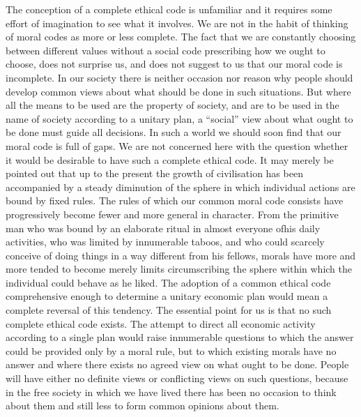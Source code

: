 \documentclass[11pt,openany]{book}
\begin{document}
The conception of a complete ethical code is unfamiliar and it requires some effort of imagination to see what it involves. We are not in the habit of thinking of moral codes as more or less complete. The fact that we are constantly choosing between different values without a social code prescribing how we ought to choose, does not surprise us, and does not suggest to us that our moral code is incomplete. In our society there is neither occasion nor reason why people should develop common views about what should be done in such situations. But where all the means to be used are the property of society, and are to be used in the name of society according to a unitary plan, a ``social'' view about what ought to be done must guide all decisions. In such a world we should soon find that our moral code is full of gaps. We are not concerned here with the question whether it would be desirable to have such a complete ethical code. It may merely be pointed out that up to the present the growth of civilisation has been accompanied by a steady diminution of the sphere in which individual actions are bound by fixed rules. The rules of which our common moral code consists have progressively become fewer and more general in character. From the primitive man who was bound by an elaborate ritual in almost everyone ofhis daily activities, who was limited by innumerable taboos, and who could scarcely conceive of doing things in a way different from his fellows, morals have more and more tended to become merely limits circumscribing the sphere within which the individual could behave as he liked. The adoption of a common ethical code comprehensive enough to determine a unitary economic plan would mean a complete reversal of this tendency. The essential point for us is that no such complete ethical code exists. The attempt to direct all economic activity according to a single plan would raise innumerable questions to which the answer could be provided only by a moral rule, but to which existing morals have no answer and where there exists no agreed view on what ought to be done. People will have either no definite views or conflicting views on such questions, because in the free society in which we have lived there has been no occasion to think about them and still less to form common opinions about them.

\begin{center}\textasteriskcentered\hspace{0.9em}\textasteriskcentered\hspace{0.9em}\textasteriskcentered\end{center}
\end{document}

